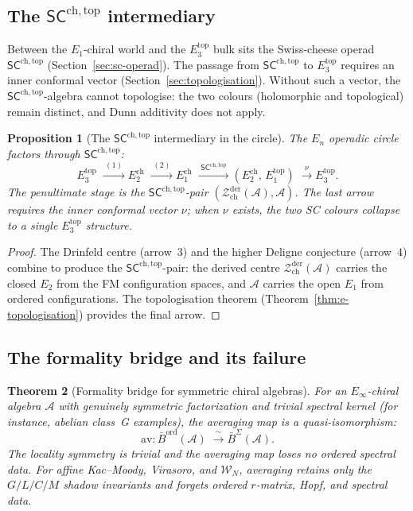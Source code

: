 \documentclass[11pt,reqno]{amsart}
\newtheorem{theorem}{Theorem}[section]
\newtheorem{proposition}[theorem]{Proposition}
\theoremstyle{definition}
\theoremstyle{remark}
\providecommand{\cA}{\mathcal{A}}
\providecommand{\cW}{\mathcal{W}}
\providecommand{\cZ}{\mathcal{Z}}
\providecommand{\Eone}{E_1}
\providecommand{\Etwo}{E_2}
\providecommand{\Ethree}{E_3}
\providecommand{\En}{E_n}
\providecommand{\Einf}{E_\infty}
\providecommand{\SCchtop}{\ensuremath{\mathsf{SC}^{\mathrm{ch,top}}}}
\providecommand{\Barord}{\bar{B}^{\mathrm{ord}}}
\providecommand{\BarSig}{\bar{B}^{\Sigma}}
\begin{document}
\subsection{The $\SCchtop$ intermediary}

Between the $\Eone$-chiral world and the
$\Ethree^{\mathrm{top}}$ bulk sits the Swiss-cheese operad
$\SCchtop$ (Section~\ref{sec:sc-operad}). The passage
from $\SCchtop$ to $\Ethree^{\mathrm{top}}$ requires an
inner conformal vector
(Section~\ref{sec:topologisation}). Without such a vector,
the $\SCchtop$-algebra cannot topologise: the two colours
(holomorphic and topological) remain distinct, and Dunn
additivity does not apply.

\begin{proposition}[The $\SCchtop$ intermediary in the circle]
\label{prop:e-sc-intermediary}
The $\En$ operadic circle factors through $\SCchtop$:
\[
\Ethree^{\mathrm{top}}
\;\xrightarrow{\;(1)\;}
\Etwo^{\mathrm{ch}}
\;\xrightarrow{\;(2)\;}
\Eone^{\mathrm{ch}}
\;\xrightarrow{\;\SCchtop\;}
(\Etwo^{\mathrm{ch}},\,\Eone^{\mathrm{top}})
\;\xrightarrow{\;\nu\;}
\Ethree^{\mathrm{top}}.
\]
The penultimate stage is the $\SCchtop$-pair
$(\cZ^{\mathrm{der}}_{\mathrm{ch}}(\cA), \cA)$.
The last arrow requires the inner conformal vector $\nu$;
when $\nu$ exists, the two SC colours collapse to a single
$\Ethree^{\mathrm{top}}$ structure.
\end{proposition}

\begin{proof}
The Drinfeld centre (arrow~$3$) and the higher Deligne
conjecture (arrow~$4$) combine to produce the $\SCchtop$-pair:
the derived centre $\cZ^{\mathrm{der}}_{\mathrm{ch}}(\cA)$
carries the closed $\Etwo$ from the FM configuration spaces,
and $\cA$ carries the open $\Eone$ from ordered configurations.
The topologisation theorem
(Theorem~\ref{thm:e-topologisation}) provides the final
arrow.
\end{proof}

\subsection{The formality bridge and its failure}

\begin{theorem}[Formality bridge for symmetric chiral algebras]
\label{thm:e-formality-bridge}
For an $\Einf$-chiral algebra $\cA$ with genuinely symmetric
factorization and trivial spectral kernel \textup{(}for instance,
abelian class~G examples\textup{)}, the averaging
map is a quasi-isomorphism:
\[
\mathrm{av}\colon
\Barord(\cA)
\;\xrightarrow{\;\sim\;}
\BarSig(\cA).
\]
The locality symmetry is trivial and the averaging map loses no
ordered spectral data. For affine Kac--Moody, Virasoro, and
$\cW_N$, averaging retains only the $G/L/C/M$ shadow invariants and
forgets ordered $r$-matrix, Hopf, and spectral data.
\end{theorem}
\end{document}
